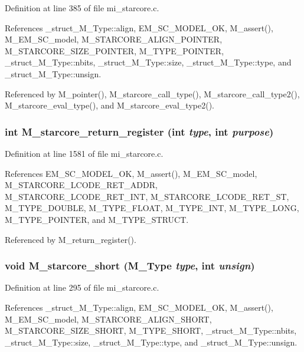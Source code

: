 Definition at line 385 of file mi\_\-starcore.c.

References \_\-struct\_\-M\_\-Type::align, EM\_\-SC\_\-MODEL\_\-OK, M\_\-assert(), M\_\-EM\_\-SC\_\-model, M\_\-STARCORE\_\-ALIGN\_\-POINTER, M\_\-STARCORE\_\-SIZE\_\-POINTER, M\_\-TYPE\_\-POINTER, \_\-struct\_\-M\_\-Type::nbits, \_\-struct\_\-M\_\-Type::size, \_\-struct\_\-M\_\-Type::type, and \_\-struct\_\-M\_\-Type::unsign.

Referenced by M\_\-pointer(), M\_\-starcore\_\-call\_\-type(), M\_\-starcore\_\-call\_\-type2(), M\_\-starcore\_\-eval\_\-type(), and M\_\-starcore\_\-eval\_\-type2().
\subsubsection{\setlength{\rightskip}{0pt plus 5cm}int M\_\-starcore\_\-return\_\-register (int {\em type}, int {\em purpose})}\label{m__starcore_8h_b6cd349676b4ca360be86e01115b649b}




Definition at line 1581 of file mi\_\-starcore.c.

References EM\_\-SC\_\-MODEL\_\-OK, M\_\-assert(), M\_\-EM\_\-SC\_\-model, M\_\-STARCORE\_\-LCODE\_\-RET\_\-ADDR, M\_\-STARCORE\_\-LCODE\_\-RET\_\-INT, M\_\-STARCORE\_\-LCODE\_\-RET\_\-ST, M\_\-TYPE\_\-DOUBLE, M\_\-TYPE\_\-FLOAT, M\_\-TYPE\_\-INT, M\_\-TYPE\_\-LONG, M\_\-TYPE\_\-POINTER, and M\_\-TYPE\_\-STRUCT.

Referenced by M\_\-return\_\-register().
\subsubsection{\setlength{\rightskip}{0pt plus 5cm}void M\_\-starcore\_\-short (\bf{M\_\-Type} {\em type}, int {\em unsign})}\label{m__starcore_8h_9894dd539380baa9897d9beaa0789f56}




Definition at line 295 of file mi\_\-starcore.c.

References \_\-struct\_\-M\_\-Type::align, EM\_\-SC\_\-MODEL\_\-OK, M\_\-assert(), M\_\-EM\_\-SC\_\-model, M\_\-STARCORE\_\-ALIGN\_\-SHORT, M\_\-STARCORE\_\-SIZE\_\-SHORT, M\_\-TYPE\_\-SHORT, \_\-struct\_\-M\_\-Type::nbits, \_\-struct\_\-M\_\-Type::size, \_\-struct\_\-M\_\-Type::type, and \_\-struct\_\-M\_\-Type::unsign.

